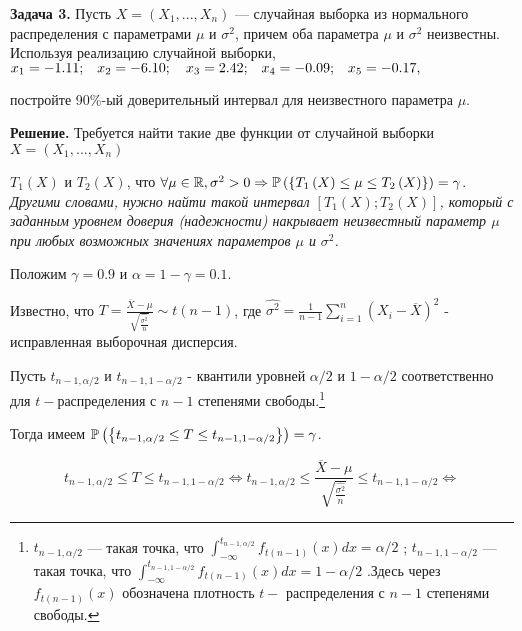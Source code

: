 \textbf{Задача 3.}  Пусть $X=\left(X_{1} ,...,X_{n} \right)$ --- случайная выборка из нормального распределения с параметрами $\mu $ и $\sigma ^{2} $, причем оба параметра $\mu $ и $\sigma ^{2} $ неизвестны. Используя реализацию случайной выборки, $x_{1} =-{\rm 1.11;}\quad x_{2} =-{\rm 6.1}0;\quad x_{3} ={\rm 2.42;}\quad x_{4} =-0.0{\rm 9;}\quad x_{5} =-0.{\rm 17,}$ 

постройте 90\%-ый доверительный интервал для неизвестного параметра $\mu $.

\textbf{Решение. }Требуется найти такие две функции от случайной выборки $X=\left(X_{1} ,...,X_{n} \right)$  

$T_{1} \left(X\right)$ и $T_{2} \left(X\right)$, что $\forall \mu \in {\mathbb R},\sigma ^{2} >0\Rightarrow {\rm {\mathbb P}}\left(\left\{T_{1} \left(X\right)\le \mu \le T_{2} \left(X\right)\right\}\right)=\gamma $. \textit{Другими словами, нужно найти такой интервал $\left[T_{1} \left(X\right);T_{2} \left(X\right)\right]$, который с заданным уровнем доверия (надежности) накрывает неизвестный параметр $\mu $ при любых возможных значениях параметров $\mu $ и }$\sigma ^{2} $\textit{.}

Положим $\gamma =0.9$ и $\alpha =1-\gamma =0.1$.

Известно, что $T=\frac{\overline{X}-\mu }{\sqrt{{\tfrac{\widehat{\sigma ^{2} }}{n}} } } \sim t\left(n-1\right)$, где $\widehat{\sigma ^{2} }={\tfrac{1}{n-1}} \sum _{i=1}^{n}\left(X_{i} -\overline{X}\right)^{2}  $ - исправленная выборочная дисперсия.

Пусть $t_{n-1,\alpha /2} $ и $t_{n-1,1-\alpha /2} $ - квантили уровней $\alpha /2$ и $1-\alpha /2$ соответственно для $t-$распределения с $n-1$ степенями свободы.\footnote{  $t_{n-1,\alpha /2} $  --- такая точка, что  $\int _{-\infty }^{t_{n-1,\alpha /2} }f_{t\left(n-1\right)} \left(x\right)dx =\alpha /2$ ;  $t_{n-1,1-\alpha /2} $  --- такая точка, что  $\int _{-\infty }^{t_{n-1,1-\alpha /2} }f_{t\left(n-1\right)} \left(x\right)dx =1-\alpha /2$ .Здесь через  $f_{t\left(n-1\right)} \left(x\right)$  обозначена плотность  $t-$ распределения с  $n-1$  степенями свободы. } 

Тогда имеем ${\rm {\mathbb P}}\left(\left\{t_{n-1,\alpha /2} \le T\le t_{n-1,1-\alpha /2} \right\}\right)=\gamma $.

\[t_{n-1,\alpha /2} \le T\le t_{n-1,1-\alpha /2} \Leftrightarrow t_{n-1,\alpha /2} \le \frac{\overline{X}-\mu }{\sqrt{{\tfrac{\widehat{\sigma ^{2} }}{n}} } } \le t_{n-1,1-\alpha /2} \Leftrightarrow \] 

